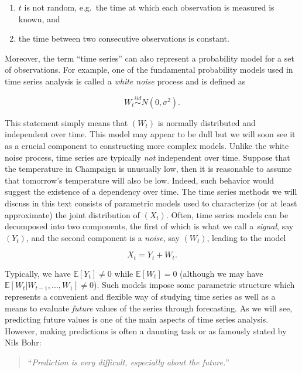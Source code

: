 \documentclass[]{book}
\providecommand{\tightlist}{%
  \setlength{\itemsep}{0pt}\setlength{\parskip}{0pt}}
\theoremstyle{definition}
\theoremstyle{definition}
\theoremstyle{definition}
\theoremstyle{remark}
\begin{document}
\begin{enumerate}
\def\labelenumi{\arabic{enumi}.}
\tightlist
\item
  \(t\) is not random, e.g.~the time at which each observation is
  measured is known, and
\item
  the time between two consecutive observations is constant.
\end{enumerate}

Moreover, the term ``time series'' can also represent a probability
model for a set of observations. For example, one of the fundamental
probability models used in time series analysis is called a \emph{white
noise} process and is defined as

\[W_t \mathop \sim \limits^{iid} N(0, \sigma^2).\]

This statement simply means that \((W_t)\) is normally distributed and
independent over time. This model may appear to be dull but we will soon
see it as a crucial component to constructing more complex models.
Unlike the white noise process, time series are typically \emph{not}
independent over time. Suppose that the temperature in Champaign is
unusually low, then it is reasonable to assume that tomorrow's
temperature will also be low. Indeed, such behavior would suggest the
existence of a dependency over time. The time series methods we will
discuss in this text consists of parametric models used to characterize
(or at least approximate) the joint distribution of \((X_t)\). Often,
time series models can be decomposed into two components, the first of
which is what we call a \emph{signal}, say \((Y_t)\), and the second
component is a \emph{noise}, say \((W_t)\), leading to the model

\[X_t = Y_t + W_t.\]

Typically, we have \(\mathbb{E}[Y_t] \neq 0\) while
\(\mathbb{E}[W_t] = 0\) (although we may have
\(\mathbb{E}[W_t | W_{t-1}, ..., W_1] \neq 0\)). Such models impose some
parametric structure which represents a convenient and flexible way of
studying time series as well as a means to evaluate \emph{future} values
of the series through forecasting. As we will see, predicting future
values is one of the main aspects of time series analysis. However,
making predictions is often a daunting task or as famously stated by
Nils Bohr:

\begin{quote}
``\emph{Prediction is very difficult, especially about the future.}''
\end{quote}
\end{document}
